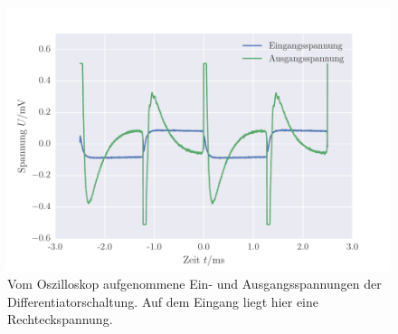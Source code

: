\FloatBarrier
\begin{figure}[!h]
\centering
\includegraphics[scale=1]{../Grafiken/Differentiator_Oszilloskop_Rechteck.pdf}
\caption{Vom Oszilloskop aufgenommene Ein- und Ausgangsspannungen der Differentiatorschaltung. Auf dem Eingang
	liegt hier eine Rechteckspannung.\label{fig:differentiator_oszilloskop_rechteck}}
\end{figure}
\FloatBarrier